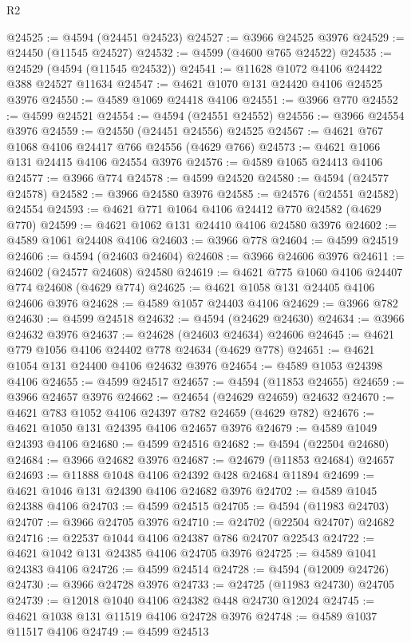 \begin{lexlean}{R2}
\begin{coremodule}
@24525 := @4594 (@24451 @24523)
@24527 := @3966 @24525 @3976
@24529 := @24450 (@11545 @24527)
@24532 := @4599 (@4600 @765 @24522)
@24535 := @24529 (@4594 (@11545 @24532))
@24541 := @11628 @1072 @4106 @24422 @388 @24527 @11634
@24547 := @4621 @1070 @131 @24420 @4106 @24525 @3976
@24550 := @4589 @1069 @24418 @4106
@24551 := @3966 @770
@24552 := @4599 @24521
@24554 := @4594 (@24551 @24552)
@24556 := @3966 @24554 @3976
@24559 := @24550 (@24451 @24556) @24525
@24567 := @4621 @767 @1068 @4106 @24417 @766 @24556 (@4629 @766)
@24573 := @4621 @1066 @131 @24415 @4106 @24554 @3976
@24576 := @4589 @1065 @24413 @4106
@24577 := @3966 @774
@24578 := @4599 @24520
@24580 := @4594 (@24577 @24578)
@24582 := @3966 @24580 @3976
@24585 := @24576 (@24551 @24582) @24554
@24593 := @4621 @771 @1064 @4106 @24412 @770 @24582 (@4629 @770)
@24599 := @4621 @1062 @131 @24410 @4106 @24580 @3976
@24602 := @4589 @1061 @24408 @4106
@24603 := @3966 @778
@24604 := @4599 @24519
@24606 := @4594 (@24603 @24604)
@24608 := @3966 @24606 @3976
@24611 := @24602 (@24577 @24608) @24580
@24619 := @4621 @775 @1060 @4106 @24407 @774 @24608 (@4629 @774)
@24625 := @4621 @1058 @131 @24405 @4106 @24606 @3976
@24628 := @4589 @1057 @24403 @4106
@24629 := @3966 @782
@24630 := @4599 @24518
@24632 := @4594 (@24629 @24630)
@24634 := @3966 @24632 @3976
@24637 := @24628 (@24603 @24634) @24606
@24645 := @4621 @779 @1056 @4106 @24402 @778 @24634 (@4629 @778)
@24651 := @4621 @1054 @131 @24400 @4106 @24632 @3976
@24654 := @4589 @1053 @24398 @4106
@24655 := @4599 @24517
@24657 := @4594 (@11853 @24655)
@24659 := @3966 @24657 @3976
@24662 := @24654 (@24629 @24659) @24632
@24670 := @4621 @783 @1052 @4106 @24397 @782 @24659 (@4629 @782)
@24676 := @4621 @1050 @131 @24395 @4106 @24657 @3976
@24679 := @4589 @1049 @24393 @4106
@24680 := @4599 @24516
@24682 := @4594 (@22504 @24680)
@24684 := @3966 @24682 @3976
@24687 := @24679 (@11853 @24684) @24657
@24693 := @11888 @1048 @4106 @24392 @428 @24684 @11894
@24699 := @4621 @1046 @131 @24390 @4106 @24682 @3976
@24702 := @4589 @1045 @24388 @4106
@24703 := @4599 @24515
@24705 := @4594 (@11983 @24703)
@24707 := @3966 @24705 @3976
@24710 := @24702 (@22504 @24707) @24682
@24716 := @22537 @1044 @4106 @24387 @786 @24707 @22543
@24722 := @4621 @1042 @131 @24385 @4106 @24705 @3976
@24725 := @4589 @1041 @24383 @4106
@24726 := @4599 @24514
@24728 := @4594 (@12009 @24726)
@24730 := @3966 @24728 @3976
@24733 := @24725 (@11983 @24730) @24705
@24739 := @12018 @1040 @4106 @24382 @448 @24730 @12024
@24745 := @4621 @1038 @131 @11519 @4106 @24728 @3976
@24748 := @4589 @1037 @11517 @4106
@24749 := @4599 @24513

\end{coremodule}
\end{lexlean}
